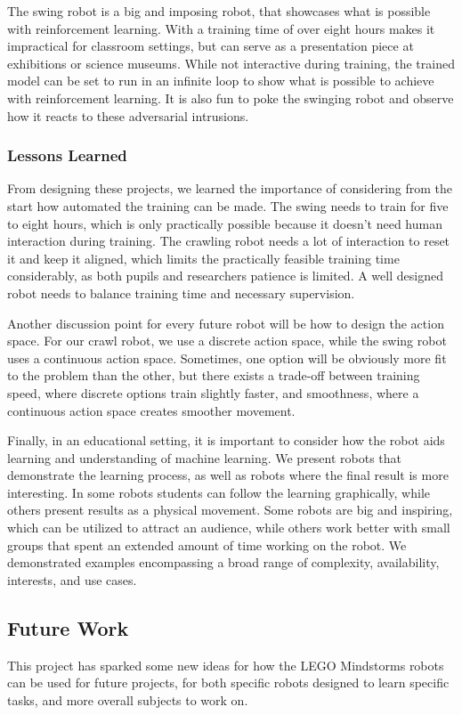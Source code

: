\documentclass[11pt, a4paper]{article}
\begin{document}
	The swing robot is a big and imposing robot, that showcases what is possible with reinforcement learning. With a training time of over eight hours makes it impractical for classroom settings, but can serve as a presentation piece at exhibitions or science museums. While not interactive during training, the trained model can be set to run in an infinite loop to show what is possible to achieve with reinforcement learning. It is also fun to poke the swinging robot and observe how it reacts to these adversarial intrusions.
	
	\medskip 
	
	\subsubsection*{Lessons Learned} 
	From designing these projects, we learned the importance of considering from the start how automated the training can be made. The swing needs to train for five to eight hours, which is only practically possible because it doesn't need human interaction during training. The crawling robot needs a lot of interaction to reset it and keep it aligned, which limits the practically feasible training time considerably, as both pupils and researchers patience is limited. A well designed robot needs to balance training time and necessary supervision.
	
	Another discussion point for every future robot will be how to design the action space. For our crawl robot, we use a discrete action space, while the swing robot uses a continuous action space. Sometimes, one option will be obviously more fit to the problem than the other, but there exists a trade-off between training speed, where discrete options train slightly faster, and smoothness, where a continuous action space creates smoother movement.
	
	Finally, in an educational setting, it is important to consider how the robot aids learning and understanding of machine learning. We present robots that demonstrate the learning process, as well as robots where the final result is more interesting. In some robots students can follow the learning graphically, while others present results as a physical movement. Some robots are big and inspiring, which can be utilized to attract an audience, while others work better with small groups that spent an extended amount of time working on the robot. We demonstrated examples encompassing a broad range of complexity, availability, interests, and use cases.
	
	\subsection{Future Work}
	This project has sparked some new ideas for how the LEGO Mindstorms robots can be used for future projects, for both specific robots designed to learn specific tasks, and more overall subjects to work on.
	
\end{document}
